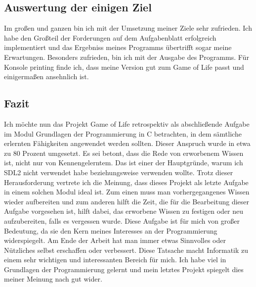 \documentclass[11pt]{scrartcl}
\begin{document}
\subsection{Auswertung der einigen Ziel}
Im gro\ss en und ganzen bin ich mit der Umsetzung meiner Ziele sehr zufrieden. Ich habe den Gro\ss teil der Forderungen auf dem Aufgabenblatt erfolgreich implementiert und das Ergebniss meines Programms übertrifft sogar meine Erwartungen. Besonders zufrieden, bin ich mit der Ausgabe des Programms. Für Konsole printing finde ich, dass meine Version gut zum Game of Life passt und einigerma\ss en ansehnlich ist.
\subsection{Fazit}
Ich möchte nun das Projekt Game of Life retrospektiv als abschließende Aufgabe im Modul Grundlagen der Programmierung in C betrachten, in dem sämtliche erlernten Fähigkeiten angewendet werden sollten. 
Dieser Anspruch wurde in etwa zu 80 Prozent umgesetzt. Es sei betont, dass die Rede von erworbenem Wissen ist, nicht nur von Kennengelerntem. Das ist einer der Hauptgründe, warum ich SDL2 nicht verwendet 
habe beziehungsweise verwenden wollte. Trotz dieser Herausforderung vertrete ich die Meinung, dass dieses Projekt als letzte Aufgabe in einem solchen Modul ideal ist. Zum einen muss man vorhergegangenes 
Wissen wieder aufbereiten und zum anderen hilft die Zeit, die für die Bearbeitung dieser Aufgabe vorgesehen ist, hilft dabei, das erworbene Wissen zu festigen oder neu aufzubereiten, falls es vergessen wurde. 
Diese Aufgabe ist für mich von großer Bedeutung, da sie den Kern meines Interesses an der Programmierung widerspiegelt. 
Am Ende der Arbeit hat man immer etwas Sinnvolles oder Nützliches selbst erschaffen oder verbessert. Diese Tatsache macht Informatik zu einem sehr wichtigen und interessanten Bereich für mich. 
Ich habe viel in Grundlagen der Programmierung gelernt und mein letztes Projekt spiegelt dies meiner Meinung nach gut wider.
 
\end{document}
